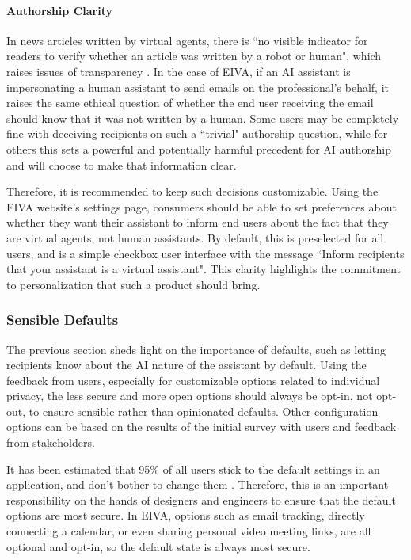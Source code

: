 \documentclass{article}
\begin{document}
\paragraph{Authorship Clarity}

In news articles written by virtual agents, there is ``no visible indicator for readers to verify whether an article was written by a robot or human", which raises issues of transparency \cite{dorr_ethical_2017}. In the case of EIVA, if an AI assistant is impersonating a human assistant to send emails on the professional's behalf, it raises the same ethical question of whether the end user receiving the email should know that it was not written by a human. Some users may be completely fine with deceiving recipients on such a ``trivial" authorship question, while for others this sets a powerful and potentially harmful precedent for AI authorship and will choose to make that information clear.

Therefore, it is recommended to keep such decisions customizable. Using the EIVA website's settings page, consumers should be able to set preferences about whether they want their assistant to inform end users about the fact that they are virtual agents, not human assistants. By default, this is preselected for all users, and is a simple checkbox user interface with the message ``Inform recipients that your assistant is a virtual assistant". This clarity highlights the commitment to personalization that such a product should bring.

\subsubsection{Sensible Defaults}

The previous section sheds light on the importance of defaults, such as letting recipients know about the AI nature of the assistant by default. Using the feedback from users, especially for customizable options related to individual privacy, the less secure and more open options should always be opt-in, not opt-out, to ensure sensible rather than opinionated defaults. Other configuration options can be based on the results of the initial survey with users and feedback from stakeholders.

It has been estimated that 95\% of all users stick to the default settings in an application, and don't bother to change them \cite{catalanotto_95_2019}. Therefore, this is an important responsibility on the hands of designers and engineers to ensure that the default options are most secure. In EIVA, options such as email tracking, directly connecting a calendar, or even sharing personal video meeting links, are all optional and opt-in, so the default state is always most secure.
\end{document}
